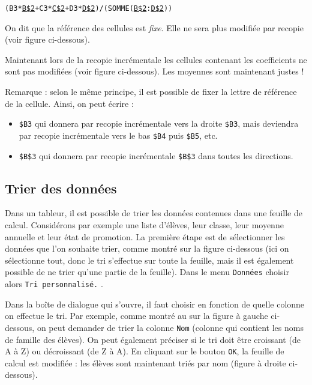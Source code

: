 \begin{center}\texttt{(B3*\underline{B\$2}+C3*\underline{C\$2}+D3*\underline{D\$2})/(SOMME(\underline{B\$2}:\underline{D\$2}))}\end{center}

On dit que la référence des cellules est \emph{fixe}. Elle ne sera plus modifiée par recopie (voir figure ci-dessous).


Maintenant lors de la recopie incrémentale les cellules contenant les coefficients ne sont pas modifiées (voir figure ci-dessous). Les moyennes sont maintenant justes !


Remarque : selon le même principe, il est possible de fixer la lettre de référence de la cellule. Ainsi, on peut écrire :

\begin{itemize}
	\item \texttt{\$B3} qui donnera par recopie incrémentale vers la droite \texttt{\$B3}, mais deviendra par recopie incrémentale vers le bas \texttt{\$B4} puis \texttt{\$B5}, etc.
	\item \texttt{\$B\$3} qui donnera par recopie incrémentale \texttt{\$B\$3} dans toutes les directions.
\end{itemize}

\subsection{Trier des données}\label{Calc3tri} 

Dans un tableur, il est possible de trier les données contenues dans une feuille de calcul. Considérons par exemple une liste d'élèves, leur classe, leur moyenne annuelle et leur état de promotion. La première étape est de sélectionner les données que l'on souhaite trier, comme montré sur la figure ci-dessous  (ici on sélectionne tout, donc le tri s'effectue sur toute la feuille, mais il est également possible de ne trier qu'une partie de la feuille). Dans le menu \texttt{Données}  choisir alors \texttt{Tri personnalisé.} .


Dans la boîte de dialogue qui s'ouvre, il faut choisir en fonction de quelle colonne on effectue le tri. Par exemple, comme montré au  sur la figure à gauche ci-dessous, on peut demander de trier la colonne \texttt{Nom} (colonne qui contient les noms de famille des élèves). On peut également préciser  si le tri doit être croissant (de A à Z) ou décroissant (de Z à A). En cliquant sur le bouton \texttt{OK}, la feuille de calcul est modifiée : les élèves sont maintenant triés par nom (figure à droite ci-dessous).

